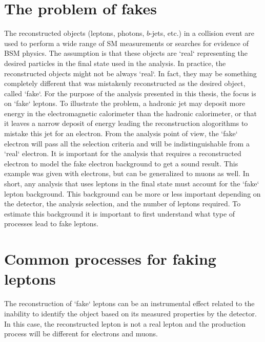 \section{The problem of fakes}

The reconstructed objects (leptons, photons, $b$-jets, etc.) in a collision event are used to perform a wide range of SM measurements 
or searches for evidence of BSM physics. The assumption is that these objects are `real` representing the desired particles 
in the final state used in the analysis. 
In practice, the reconstructed objects might not be always `real`. In fact, they may be something completely different that
was mistakenly reconstructed as the desired object, called `fake`. 
For the purpose of the analysis presented in this thesis, the focus is on `fake` leptons. 
To illustrate the problem, a hadronic jet may deposit more energy in the electromagnetic calorimeter than the hadronic calorimeter, 
or that it leaves a narrow deposit of energy leading the reconstruction alogorithms to mistake this jet for an electron.
From the analysis point of view, the `fake` electron will pass all the selection criteria and will be indistinguishable from 
a `real` electron. 
It is important for the analysis that requires a reconstructed electron to model the fake electron background to get a sound 
result. This example was given with electrons, but can be generalized to muons as well. 
In short, any analysis that uses leptons in the final state must account for the `fake` lepton background. 
This background can be more or less important depending on the detector, the analysis selection, and the number of leptons required. 
To estimate this background it is important to first understand what type of processes lead to fake leptons.


\section{Common processes for faking leptons}

The reconstruction of `fake` leptons can be an instrumental effect related to the inability to identify the object based on 
its measured properties by the detector. In this case, the reconstructed lepton is not a real lepton and the production process 
will be different for electrons and muons.

